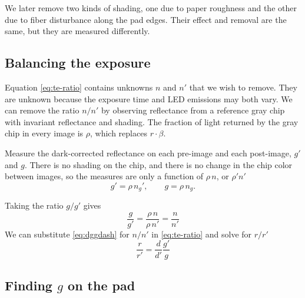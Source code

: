 \documentclass[11pt,letter]{article}
\newcommand{\COMMENT}[1]{}
\begin{document}
We later remove two kinds of shading,  
one due to paper roughness and the other due to fiber disturbance along the pad edges.
Their effect and removal are the same, but they are measured differently.

\subsection{Balancing the exposure}

Equation \eqref{eq:te-ratio} contains unknowns $n$ and $n'$ that we wish to remove.
They are unknown because the exposure time and LED emissions may both vary.
We can remove the ratio $n/n'$ by observing reflectance from a reference gray chip with invariant reflectance and shading.
The fraction of light returned by the gray chip in every image is $\rho$, which replaces $r \cdot \beta$.

Measure the dark-corrected reflectance on each pre-image and each post-image, $g'$ and $g$.
There is no shading on the chip, and there is no change in the chip color between images, 
so the measures are only a function of $\rho \, n$, or $\rho' n'$
\begin{equation}
	g' = \rho\, n_g', \qquad g = \rho \, n_g .
\end{equation}
 
Taking the ratio $g / g'$ gives
\begin{equation}
	\frac{g}{g'} = \frac{\rho \, n}{\rho \, n'} = \frac{n}{n'}
	\label{eq:dggdash}
\end{equation}
We can substitute \eqref{eq:dggdash} for  $n / n'$ in \eqref{eq:te-ratio}
and solve for $r / r'$
\begin{equation}
	\frac{r}{r'} = \frac{d}{d'} \frac{g'}{g}
	\label{eq:daadash}
\end{equation}

\subsection{Finding $g$ on the pad}

\COMMENT{In this section I need to show clearly and simply how $P$ works to estimate $g'$ and $g$ during measurments.  I think I have to show the basic solution of $P$ during calibration, minimizing $g - P$ using least squares, and then how $P$ is used to extrapolate from the reference gray chips to the equivalent reference gray value at the pad during measurements.  I'd like to first show how that would work using a single gray reference chip with only a scalar multiplier on $P$, and then how it would work using multiple gray reference readings and linear or bilinear multiplier on $P$.  The difficulty is to show that the algebra is correct without getting too detailed. For example, I'd like to say that $P$ is found by minimizing $(P - g)^2$ over the area, and not show the matrix solution.  }
\end{document}
